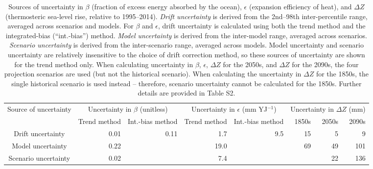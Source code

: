 \begin{table*}[t]
\centering
\caption{Sources of uncertainty in $\beta$ (fraction of excess energy absorbed by the ocean), $\epsilon$ (expansion efficiency of heat), and $\Delta Z$ (thermosteric sea-level rise, relative to 1995--2014). \emph{Drift uncertainty} is derived from the 2nd--98th inter-percentile range, averaged across scenarios and models. For $\beta$ and $\epsilon$, drift uncertainty is calculated using both the trend method and the integrated-bias (``int.-bias'') method. \emph{Model uncertainty} is derived from the inter-model range, averaged across scenarios. \emph{Scenario uncertainty} is derived from the inter-scenario range, averaged across models. Model uncertainty and scenario uncertainty are relatively insensitive to the choice of drift correction method, so these sources of uncertainty are shown for the trend method only. When calculating uncertainty in $\beta$, $\epsilon$, $\Delta Z$ for the 2050s, and $\Delta Z$ for the 2090s, the four projection scenarios are used (but not the historical scenario). When calculating the uncertainty in $\Delta Z$ for the 1850s, the single historical scenario is used instead -- therefore, scenario uncertainty cannot be calculated for the 1850s. Further details are provided in Table S2.}
\begin{tabular}{c|rr|rr|rrr}
\toprule
Source of uncertainty & \multicolumn{2}{c|}{Uncertainty in $\beta$ (unitless)} & \multicolumn{2}{c|}{Uncertainty in $\epsilon$ (mm YJ$^{-1}$)} & \multicolumn{3}{c}{Uncertainty in $\Delta Z$ (mm)} \\
 & Trend method & Int.-bias method & Trend method & Int.-bias method & 1850s & 2050s & 2090s \\
\midrule
Drift uncertainty & 0.01 & 0.11 & 1.7 & 9.5 & 15 & 5 & 9 \\
Model uncertainty & 0.22 &  & 19.0 &  & 69 & 49 & 101 \\
Scenario uncertainty & 0.02 &  & 7.4 &  &  & 22 & 136 \\
\bottomrule
\end{tabular}
\end{table*}

